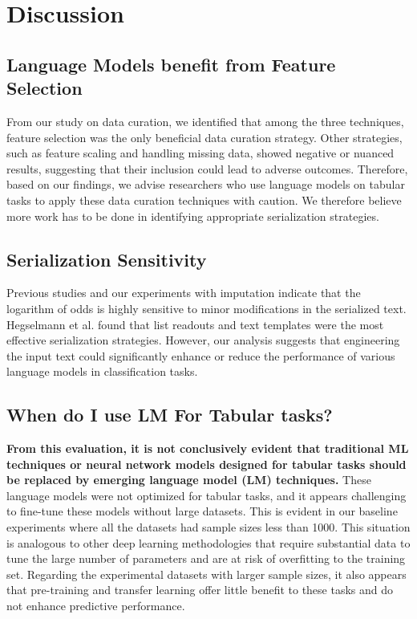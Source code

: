 \documentclass{article}
\theoremstyle{plain}
\theoremstyle{definition}
\theoremstyle{remark}
\begin{document}
\section{Discussion}

\subsection{Language Models benefit from Feature Selection}

From our study on data curation, we identified that among the three techniques, feature selection was the only beneficial data curation strategy. Other strategies, such as feature scaling and handling missing data, showed negative or nuanced results, suggesting that their inclusion could lead to adverse outcomes. Therefore, based on our findings, we advise researchers who use language models on tabular tasks to apply these data curation techniques with caution. We therefore believe more work has to be done in identifying appropriate serialization strategies.


\subsection{Serialization Sensitivity}
\label{sensitivity}

Previous studies \cite{hegselmann2023tabllm} and our experiments with imputation indicate that the logarithm of odds is highly sensitive to minor modifications in the serialized text. Hegselmann et al. found that list readouts and text templates were the most effective serialization strategies. However, our analysis suggests that engineering the input text could significantly enhance or reduce the performance of various language models in classification tasks.

\vspace{-0.05cm}
\subsection{When do I use LM For Tabular tasks?}

\textbf{From this evaluation, it is not conclusively evident that traditional ML techniques or neural network models designed for tabular tasks should be replaced by emerging language model (LM) techniques.} These language models were not optimized for  tabular tasks, and it appears challenging to fine-tune these models without large datasets. This is evident in our baseline experiments where all the datasets had sample sizes less than 1000. This situation is analogous to other deep learning methodologies that require substantial data to tune the large number of parameters and are at risk of overfitting to the training set. Regarding the experimental datasets with larger sample sizes, it also appears that pre-training and transfer learning offer little benefit to these tasks and do not enhance predictive performance.
\end{document}
